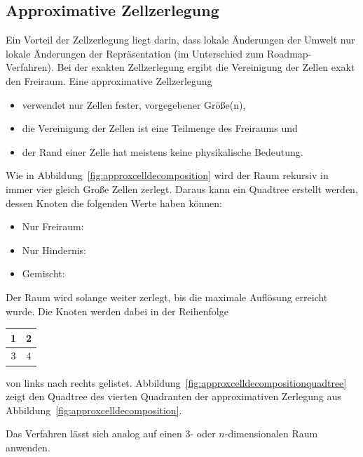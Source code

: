 		\subsection{Approximative Zellzerlegung}
			Ein Vorteil der Zellzerlegung liegt darin, dass lokale Änderungen der Umwelt nur lokale Änderungen der Repräsentation (im Unterschied zum Roadmap-Verfahren). Bei der exakten Zellzerlegung ergibt die Vereinigung der Zellen exakt den Freiraum. Eine approximative Zellzerlegung
			\begin{itemize}
				\item verwendet nur Zellen fester, vorgegebener Größe(n),
				\item die Vereinigung der Zellen ist eine Teilmenge des Freiraums und
				\item der Rand einer Zelle hat meistens keine physikalische Bedeutung.
			\end{itemize}
			Wie in Abbildung~\ref{fig:approxcelldecomposition} wird der Raum rekursiv in immer vier gleich Große Zellen zerlegt. Daraus kann ein Quadtree erstellt werden, dessen Knoten die folgenden Werte haben können:
			\begin{itemize}
				\item Nur Freiraum:  \tabto{3cm} \whiteBox
				\item Nur Hindernis: \tabto{3cm} \blackBox
				\item Gemischt:      \tabto{3cm} \grayBox
			\end{itemize}
			Der Raum wird solange weiter zerlegt, bis die maximale Auflösung erreicht wurde. Die Knoten werden dabei in der Reihenfolge
			\begin{table}[H]
				\centering
				\begin{tabular}{|c|c|}
					\hline
					\num{1} & \num{2} \\ \hline
					\num{3} & \num{4} \\ \hline
				\end{tabular}
			\end{table}
			von links nach rechts gelistet. Abbildung~\ref{fig:approxcelldecompositionquadtree} zeigt den Quadtree des vierten Quadranten der approximativen Zerlegung aus Abbildung~\ref{fig:approxcelldecomposition}.
			
			Das Verfahren lässt sich analog auf einen 3- oder \(n\)-dimensionalen Raum anwenden.
		
